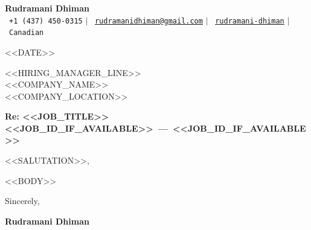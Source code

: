 \documentclass[11pt]{article}
\begin{document}
\begin{center}
    \textbf{\Huge Rudramani Dhiman} \\ \vspace{6pt}
    \small
    \faPhone*\ \texttt{+1 (437) 450-0315}
    \hspace{4pt}$|$\hspace{4pt}
    \faEnvelope\ \href{mailto:rudramanidhiman@gmail.com}{\texttt{rudramanidhiman@gmail.com}}
    \hspace{4pt}$|$\hspace{4pt}
    \faLinkedin\ \href{https://linkedin.com/in/rudramani-dhiman}{\texttt{rudramani-dhiman}}
    \hspace{4pt}$|$\hspace{4pt}
    \faMapMarker*\ \texttt{Canadian}
\end{center}

\vspace{14pt}

<<DATE>>

\vspace{8pt}

<<HIRING_MANAGER_LINE>>\\
<<COMPANY_NAME>>\\
<<COMPANY_LOCATION>>

\vspace{8pt}

\textbf{Re: <<JOB_TITLE>>%
\ifx\empty<<JOB_ID_IF_AVAILABLE>>\empty\else\ ---\ <<JOB_ID_IF_AVAILABLE>>\fi}

\vspace{8pt}

<<SALUTATION>>,

\vspace{4pt}

<<BODY>>

\vspace{12pt}

Sincerely,

\vspace{14pt}
\textbf{Rudramani Dhiman}
\end{document}
